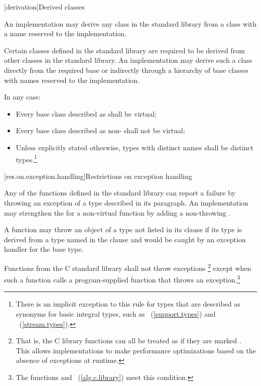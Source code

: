 [derivation]{Derived classes}

\pnum
{}%
%
An implementation may derive any class in the \Cpp standard library from a class with a
name reserved to the implementation.

\pnum
Certain classes defined in the \Cpp standard library are required to be derived from
other classes
in the \Cpp standard library.
%
An implementation may derive such a class directly from the required base or indirectly
through a hierarchy of base classes with names reserved to the implementation.

\pnum
In any case:

\begin{itemize}
\item
Every base class described as
shall be virtual;
%
\item
Every base class described as
non-
shall not be virtual;
%
\item
Unless explicitly stated otherwise, types with distinct names shall be distinct
types.\footnote{There is an implicit exception to this rule for types that are
described as synonyms for basic integral types, such as
~(\ref{support.types}) and
~(\ref{stream.types}).}
\end{itemize}

[res.on.exception.handling]{Restrictions on exception handling}%
%

\pnum
Any of the functions defined in the \Cpp standard library
%
can report a failure by throwing an exception of a type described in its
paragraph.
An implementation may strengthen the
for a
non-virtual
function by adding a non-throwing .

\pnum
A function may throw an object of a type not listed in its 
clause if its type is derived from a type named in the  clause
and would be caught by an exception handler for the base type.

\pnum
Functions from the C standard library shall not throw exceptions%
\footnote{That is, the C
library functions can all be treated as if they
are marked .
This allows implementations to make performance optimizations
based on the absence of exceptions at runtime.}
except when such a function calls a program-supplied function that throws an
exception.\footnote{The functions
and
~(\ref{alg.c.library}) meet this condition.}

